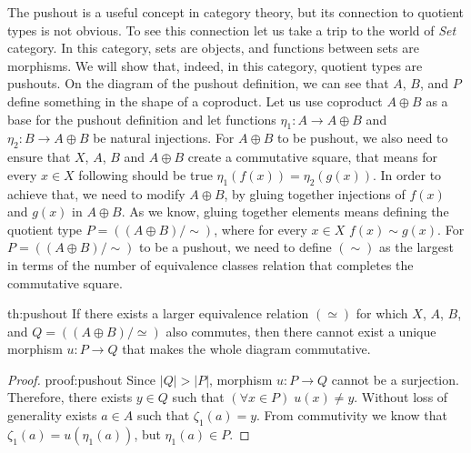 The pushout is a useful concept in category theory, but its connection to quotient types is not obvious. To see this connection let us take a trip to the world of \emph{Set} category. In this category, sets are objects, and functions between sets are morphisms. We will show that, indeed, in this category, quotient types are pushouts. On the diagram of the pushout definition, we can see that $A$, $B$, and $P$ define something in the shape of a coproduct. Let us use coproduct $A \oplus B$ as a base for the pushout definition and let functions $\eta_1: A \rightarrow A \oplus B$ and $\eta_2: B \rightarrow A \oplus B$ be natural injections. For $A \oplus B$ to be pushout, we also need to ensure that $X$, $A$, $B$ and $A \oplus B$ create a commutative square, that means for every $x \in X$ following should be true $\eta_1(f(x)) = \eta_2(g(x))$. In order to achieve that, we need to modify $A \oplus B$, by gluing together injections of $f(x)$ and $g(x)$ in $A \oplus B$. As we know, gluing together elements means defining the quotient type $P = ((A \oplus B) / \sim)$, where for every $x \in X$ $f(x) \sim g(x)$. For $P = ((A \oplus B) / \sim)$ to be a pushout, we need to define $(\sim)$ as the largest in terms of the number of equivalence classes relation that completes the commutative square. 
\begin{theo}{}{th:pushout}
If there exists a larger equivalence relation $(\simeq)$ for which  $X$, $A$, $B$, and $Q = ((A \oplus B
)/\simeq)$ also commutes, then there cannot exist a unique morphism $u: P \rightarrow Q$ that makes the whole diagram commutative. 
\end{theo}

\begin{proof}{}{proof:pushout}
Since $|Q| > |P|$, morphism $u: P \rightarrow Q$ cannot be a surjection. Therefore,  there exists $y \in Q$ such that $(\forall x \in P) \; u(x) \neq y$. 
Without loss of generality exists $a \in A$ such that $\zeta_1(a) = y$. From commutivity we know that $\zeta_1(a) = u(\eta_1(a))$, but $\eta_1(a) \in P$. \contradiction
\end{proof}


